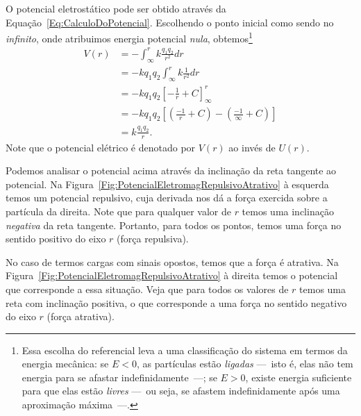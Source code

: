 O potencial eletrostático  pode ser obtido através da Equação~\ref{Eq:CalculoDoPotencial}. Escolhendo o ponto inicial como sendo no \emph{infinito}, onde atribuimos energia potencial \emph{nula}, obtemos\footnote{Essa escolha do referencial leva a uma classificação do sistema em termos da energia mecânica: se $E < 0$, as partículas estão \emph{ligadas} ---~isto é, elas não tem energia para se afastar indefinidamente~---; se $E > 0$, existe energia suficiente para que elas estão \emph{livres} ---~ou seja, se afastem indefinidamente após uma aproximação máxima~---.} 
\begin{align}
    V(r) &= - \int_\infty^r k\frac{q_1q_2}{r^2} dr \\
    &= -k q_1 q_2 \int_\infty^r k\frac{1}{r^2} dr \\
    &= -k q_1 q_2 \left[-\frac{1}{r} + C\right]_\infty^r \\
    &= -k q_1 q_2 \left[\left(\frac{-1}{r} + C \right) - \left(\frac{-1}{\infty} + C\right)\right] \\
    &= k\frac{q_1 q_2}{r}.
\end{align}
%
Note que o potencial elétrico é denotado por $V(r)$ ao invés de $U(r)$.

Podemos analisar o potencial acima através da inclinação da reta tangente ao potencial. Na Figura~\ref{Fig:PotencialEletromagRepulsivoAtrativo} à esquerda temos um potencial repulsivo, cuja derivada nos dá a força exercida sobre a partícula da direita. Note que para qualquer valor de $r$ temos uma inclinação \emph{negativa} da reta tangente. Portanto, para todos os pontos, temos uma força no sentido positivo do eixo $r$ (força repulsiva).

No caso de termos cargas com sinais opostos, temos que a força é atrativa. Na Figura~\ref{Fig:PotencialEletromagRepulsivoAtrativo} à direita temos o potencial que corresponde a essa situação. Veja que para todos os valores de $r$ temos uma reta com inclinação positiva, o que corresponde a uma força no sentido negativo do eixo $r$ (força atrativa).

